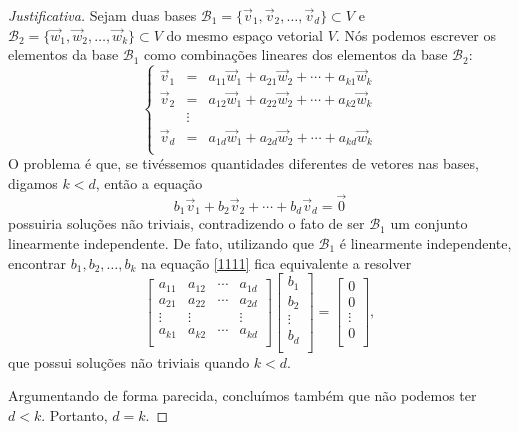 \begin{proof}[Justificativa] Sejam duas bases $\mathcal{B}_1 = \{\vec{v}_1, \vec{v}_2, \dots, \vec{v}_d\} \subset V$ e $\mathcal{B}_2 = \{\vec{w}_1, \vec{w}_2, \dots, \vec{w}_k\} \subset V$ do mesmo espaço vetorial $V$. Nós podemos escrever os elementos da base $\mathcal{B}_1$ como combinações lineares dos elementos da base $\mathcal{B}_2$:
	\begin{equation}
	\left\{
	\begin{array}{rcl}
	\vec{v}_1 &=& a_{11} \vec{w}_1 + a_{21} \vec{w}_2 + \cdots + a_{k1} \vec{w}_k \\
	\vec{v}_2 &=& a_{12} \vec{w}_1 + a_{22} \vec{w}_2 + \cdots + a_{k2} \vec{w}_k \\
	&     \vdots& \\
	\vec{v}_d &=& a_{1d} \vec{w}_1 + a_{2d} \vec{w}_2 + \cdots + a_{kd} \vec{w}_k \\
	\end{array}
	\right.
	\end{equation} O problema é que, se tivéssemos quantidades diferentes de vetores nas bases, digamos $k<d$, então a equação
	\begin{equation}\label{1111}
	b_1 \vec{v}_1 + b_2 \vec{v}_2 + \cdots + b_d \vec{v}_d = \vec{0}
	\end{equation} possuiria soluções não triviais, contradizendo o fato de ser $\mathcal{B}_1$ um conjunto linearmente independente. De fato, utilizando que $\mathcal{B}_1$ é linearmente independente, encontrar $b_1, b_2, \dots, b_k$ na equação \eqref{1111} fica equivalente a resolver
	\begin{equation}
	\left[
	\begin{array}{cccc}
	a_{11} & a_{12} & \cdots & a_{1d} \\
	a_{21} & a_{22} & \cdots & a_{2d} \\
	\vdots & \vdots &        & \vdots \\
	a_{k1} & a_{k2} & \cdots & a_{kd} \\
	\end{array}
	\right]
	\left[
	\begin{array}{c}
	b_1 \\
	b_2 \\
	\vdots  \\
	b_d \\
	\end{array}
	\right] =
	\left[
	\begin{array}{c}
	0 \\
	0 \\
	\vdots  \\
	0 \\
	\end{array}
	\right],
	\end{equation} que possui soluções não triviais quando $k<d$.

	Argumentando de forma parecida, concluímos também que não podemos ter $d<k$. Portanto, $d=k$.
\end{proof}


